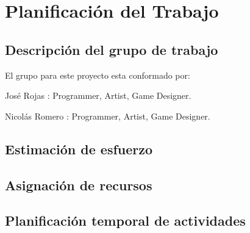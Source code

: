 \section{Planificación del Trabajo}

\subsection{Descripción del grupo de trabajo}
El grupo para este proyecto esta conformado por:

José Rojas : Programmer, Artist, Game Designer.

Nicolás Romero : Programmer, Artist, Game Designer.

\subsection{Estimación de esfuerzo}

\subsection{Asignación de recursos}

\subsection{Planificación temporal de actividades}